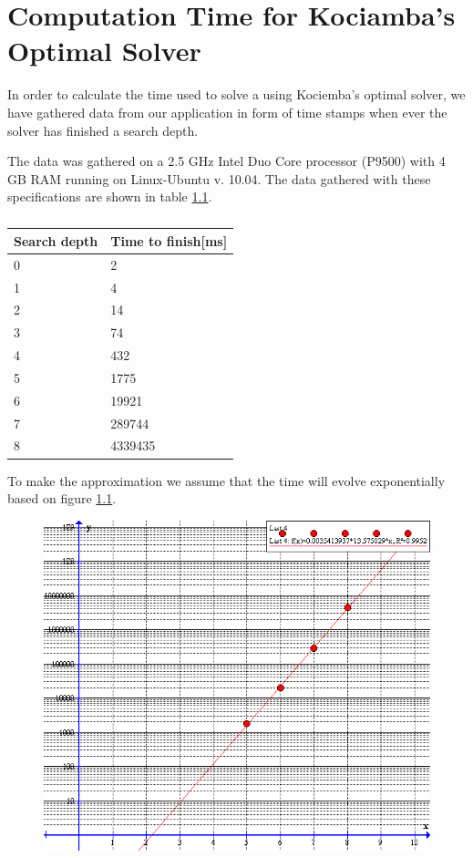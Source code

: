 \chapter{Computation Time for Kociamba's Optimal Solver}
In order to calculate the time used to solve a \rubik{} using Kociemba's optimal solver, we have gathered data from our application in form of time stamps when ever the solver has finished a search depth.

The data was gathered on a 2.5 GHz Intel Duo Core processor (P9500) with 4 GB RAM running on Linux-Ubuntu v. 10.04.
The data gathered with these specifications are shown in table \ref{tab:timeData}.

\begin{table}[hb]
\centering
	\begin{tabular}{|l|l|}
	\hline
	Search depth&Time to finish[ms]\\
	\hline
	0&2\\
	\hline
	1&4\\
	\hline
	2&14\\
	\hline
	3&74\\
	\hline
	4&432\\
	\hline
	5&1775\\
	\hline
	6&19921\\
	\hline
	7&289744\\
	\hline
	8&4339435\\
	\hline
	\end{tabular}
\caption{}
	\label{tab:timeData}
\end{table}

To make the approximation we assume that the time will evolve exponentially based on figure \ref{fig:timeFunction}.

\begin{figure}[tbh]
	\centering
		\includegraphics[scale=0.5]{input/pics/timeFunction}
	\caption{}
	\label{fig:timeFunction}
\end{figure}

